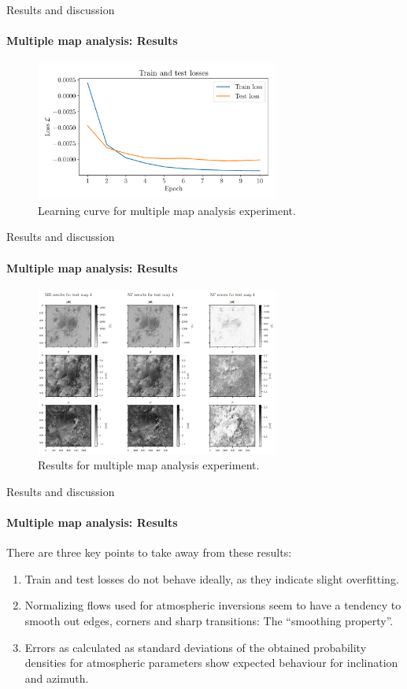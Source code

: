 \documentclass{beamer}
\begin{document}
\begin{frame}[allowframebreaks]{Results and discussion}
	\framesubtitle{Multiple map analysis: Results} %
\begin{figure}[h!]
	\centering
	\includegraphics[width=8cm]{figures/thesis/nf-milne-eddington-example-2-loss-nflows-piecewisequadratic.pdf}
	\caption{Learning curve for multiple map analysis experiment.}
	\label{fig:nf-milne-eddington-example-2-loss-nflows-piecewisequadratic}
\end{figure}
\end{frame}

\begin{frame}[allowframebreaks]{Results and discussion}
	\framesubtitle{Multiple map analysis: Results} %
	\begin{figure}[h!]
		\centering
		\includegraphics[width=8cm]{figures/presentation/exp3_fig1.png}
		\caption{Results for multiple map analysis experiment.}
		\label{fig:exp3_fig1}
	\end{figure}
\end{frame}

\begin{frame}[allowframebreaks]{Results and discussion}
\framesubtitle{Multiple map analysis: Results} %
There are three key points to take away from these results:
\begin{enumerate}
\item Train and test losses do not behave ideally, as they indicate slight overfitting.
\item Normalizing flows used for atmospheric inversions seem to have a tendency to smooth out edges, corners and sharp transitions: The ``smoothing property''.
\item Errors as calculated as standard deviations of the obtained probability densities for atmospheric parameters show expected behaviour for inclination and azimuth.
\end{enumerate}
\end{frame}
\end{document}
